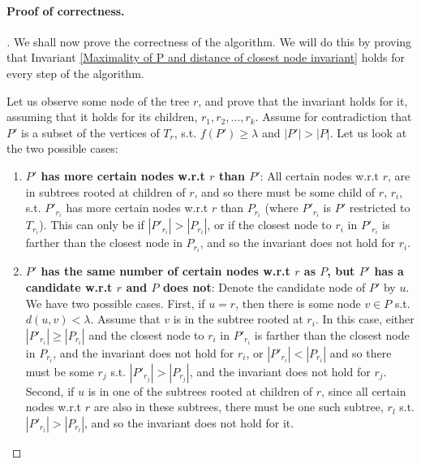 \documentclass[11pt,a4paper]{article}
\theoremstyle{definition}
\theoremstyle{remark}
\begin{document}
\paragraph{Proof of correctness.} \begin{proof}[\unskip\nopunct]
We shall now prove the correctness of the algorithm. We will do this by proving that Invariant \ref{Maximality of P and distance of closest node invariant} holds for every step of the algorithm.

Let us observe some node of the tree $r$, and prove that the invariant holds for it, assuming that it holds for its children, $r_{1},r_{2},\ldots,r_{k}$. Assume for contradiction that $P'$ is a subset of the vertices of $T_r$, s.t. $f(P')\geq\lambda$ and $|P'| > |P|$. Let us look at the two possible cases:
\begin{enumerate}
\item \textbf{\boldmath$P'$ has more certain nodes w.r.t \boldmath$r$ than \boldmath$P'$}: All certain nodes w.r.t $r$, are in subtrees rooted at children of $r$, and so there must be some child of $r$, $r_i$, s.t. $P'_{r_i}$ has more certain nodes w.r.t $r$ than $P_{r_i}$ (where $P'_{r_i}$ is $P'$ restricted to $T_{r_i}$). This can only be if $|P'_{r_i}| > |P_{r_i}|$, or if the closest node to $r_i$ in $P'_{r_i}$ is farther than the closest node in $P_{r_i}$, and so the invariant does not hold for $r_i$.
\item \textbf{\boldmath$P'$ has the same number of certain nodes w.r.t \boldmath$r$ as \boldmath$P$, but \boldmath$P'$ has a candidate w.r.t \boldmath$r$  and \boldmath$P$ does not}: Denote the candidate node of $P'$ by $u$. We have two possible cases. First, if $u=r$, then there is some node $v \in P$ s.t. $d(u,v)<\lambda$. Assume that $v$ is in the subtree rooted at $r_i$. In this case, either $|P'_{r_i}| \geq |P_{r_i}|$ and the closest node to $r_i$ in $P'_{r_i}$ is farther than the closest node in $P_{r_i}$, and the invariant does not hold for $r_i$, or $|P'_{r_i}|<|P_{r_i}|$ and so there must be some $r_j$ s.t. $|P'_{r_j}|>|P_{r_j}|$, and the invariant does not hold for $r_j$. Second, if $u$ is in one of the subtrees rooted at children of $r$, since all certain nodes w.r.t $r$ are also in these subtrees, there must be one such subtree, $r_l$ s.t. $|P'_{r_l}| > |P_{r_l}|$, and so the invariant does not hold for it.
\end{enumerate} 

\end{proof}
\end{document}
